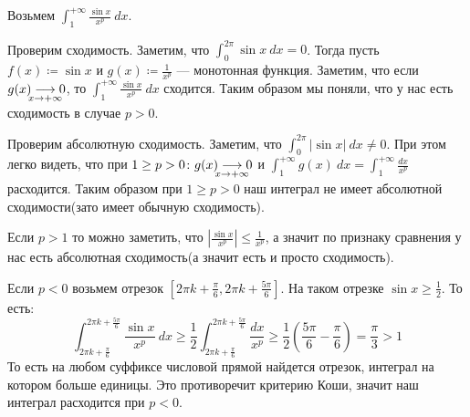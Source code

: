   \begin{example}
    Возьмем $\displaystyle \int_{1}^{+\infty} \frac{\sin x}{x^p} \: dx$.
  
    Проверим сходимость. Заметим, что $\int_{0}^{2\pi} \sin x \: dx = 0$. Тогда пусть $f(x) \coloneqq \sin x$ и $g(x) \coloneqq \frac{1}{x^p}$ --- монотонная функция.
    Заметим, что если $g(x) \underset{\mathclap{x \to +\infty}}{\longrightarrow} 0$, то
    $\int_{1}^{+\infty} \frac{\sin x}{x^p} \: dx$ сходится. Таким образом мы поняли, что у нас есть сходимость в случае $p > 0$.
  
    Проверим абсолютную сходимость. Заметим, что $\int_{0}^{2\pi} | \sin x | \: dx \neq 0$. При этом легко видеть, что при $1 \geq p > 0\colon g(x) \underset{\mathclap{x \to +\infty}}{\longrightarrow} 0$ и $\int_{1}^{+\infty} g(x) \: dx = \int_{1}^{+\infty} \frac{dx}{x^p}$ расходится. Таким образом при $1 \geq p > 0$ наш интеграл не имеет абсолютной сходимости(зато имеет обычную сходимость).
  
    Если $p > 1$ то можно заметить, что $\left | \frac{\sin x}{x^p} \right | \leq \frac{1}{x^p}$, а значит по признаку сравнения у нас есть абсолютная сходимость(а значит есть и просто сходимость).
  
    Если $p < 0$ возьмем отрезок $[2\pi k + \frac{\pi}{6}, 2\pi k + \frac{5\pi}{6}]$. На таком отрезке $\sin x \geq \frac{1}{2}$. То есть:
    \begin{equation*}
      \int_{2\pi k + \frac{\pi}{6}}^{2 \pi k + \frac{5 \pi}{6}}
      \frac{\sin x}{x^p} \: dx
      \geq
      \frac{1}{2} \int_{2\pi k + \frac{\pi}{6}}^{2\pi k + \frac{5 \pi}{6}}
      \frac{dx}{x^p}
      \geq
      \frac{1}{2}(\frac{5 \pi}{6} - \frac{\pi}{6}) = \frac{\pi}{3} > 1
    \end{equation*}
    То есть на любом суффиксе числовой прямой найдется отрезок, интеграл на котором больше единицы. Это противоречит критерию Коши, значит наш интеграл расходится при $p < 0$.
  \end{example}
  